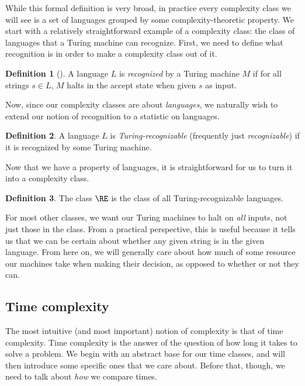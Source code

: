 \documentclass[english,12pt]{reedthesis}
\theoremstyle{plain}
\theoremstyle{definition}
\newtheorem{defn}[defn]{Definition}
\theoremstyle{remark}
\begin{document}
While this formal definition is very broad, in practice every complexity class
we will see is a set of languages grouped by some complexity-theoretic property.
We start with a relatively straightforward example of a complexity class: the
class of languages that a Turing machine can recognize. First, we need to
define what recognition is in order to make a complexity class out of it.

\begin{defn}[{\cite[Def.\ 3.2]{Sip97}}]\label{def:recognition}
  A language $L$ is \emph{recognized} by a Turing machine $M$ if for all strings
  $s \in L$, $M$ halts in the accept state when given $s$ as input.
\end{defn}

Now, since our complexity classes are about \emph{languages}, we naturally wish
to extend our notion of recognition to a statistic on languages.

\begin{defn}\label{def:turing-recognizable}
  A language $L$ is \emph{Turing-recognizable} (frequently just
  \emph{recognizable}) if it is recognized by some Turing machine.
\end{defn}

Now that we have a property of languages, it is straightforward for us to turn
it into a complexity class.

\begin{defn}\label{def:re}
  The class $\RE$ is the class of all Turing-recognizable languages.
\end{defn}

For most other classes, we want our Turing machines to halt on \emph{all}
inputs, not just those in the class. From a practical perspective, this is
useful because it tells us that we can be certain about whether any given string
is in the given language. From here on, we will generally care about how much of
some resource our machines take when making their decision, as opposed to
whether or not they can.

\subsection{Time complexity}

The most intuitive (and most important) notion of complexity is that of time
complexity. Time complexity is the answer of the question of how long it takes
to solve a problem. We begin with an abstract base for our time classes, and
will then introduce some specific ones that we care about. Before that, though,
we need to talk about \emph{how} we compare times.
\end{document}
